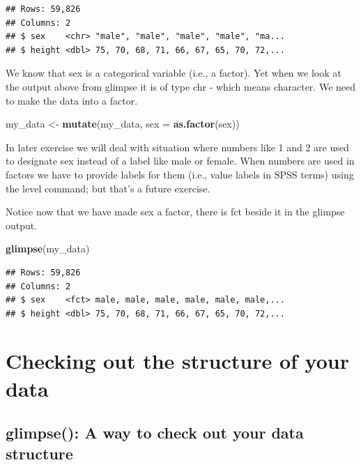 \documentclass[
]{krantz}
\makeatletter
\newenvironment{Shaded}{\begin{snugshade}}{\end{snugshade}}
\newcommand{\DataTypeTok}[1]{\textcolor[rgb]{0.27,0.27,0.27}{#1}}
\newcommand{\KeywordTok}[1]{\textcolor[rgb]{0.27,0.27,0.27}{\textbf{#1}}}
\newcommand{\NormalTok}[1]{#1}
\newcommand{\StringTok}[1]{\textcolor[rgb]{0.5,0.5,0.5}{#1}}
\newenvironment{kframe}{%
\medskip{}
\setlength{\fboxsep}{.8em}
 \def\at@end@of@kframe{}%
 \ifinner\ifhmode%
  \def\at@end@of@kframe{\end{minipage}}%
  \begin{minipage}{\columnwidth}%
 \fi\fi%
 \def\FrameCommand##1{\hskip\@totalleftmargin \hskip-\fboxsep
 \colorbox{shadecolor}{##1}\hskip-\fboxsep
     \hskip-\linewidth \hskip-\@totalleftmargin \hskip\columnwidth}%
 \MakeFramed {\advance\hsize-\width
   \@totalleftmargin\z@ \linewidth\hsize
   \@setminipage}}%
 {\par\unskip\endMakeFramed%
 \at@end@of@kframe}
\renewenvironment{Shaded}{\begin{kframe}}{\end{kframe}}
\makeatother
\begin{document}
\begin{verbatim}
## Rows: 59,826
## Columns: 2
## $ sex    <chr> "male", "male", "male", "male", "ma...
## $ height <dbl> 75, 70, 68, 71, 66, 67, 65, 70, 72,...
\end{verbatim}

We know that sex is a categorical variable (i.e., a factor). Yet when we look at the output above from glimpse it is of type chr - which means character. We need to make the data into a factor.

\begin{Shaded}
\begin{Highlighting}[]
\NormalTok{my_data <-}\StringTok{ }\KeywordTok{mutate}\NormalTok{(my_data, }\DataTypeTok{sex =} \KeywordTok{as.factor}\NormalTok{(sex))}
\end{Highlighting}
\end{Shaded}

In later exercise we will deal with situation where numbers like 1 and 2 are used to designate sex instead of a label like male or female. When numbers are used in factors we have to provide labels for them (i.e., value labels in SPSS terms) using the level command; but that's a future exercise.

Notice now that we have made sex a factor, there is fct beside it in the glimpse output.

\begin{Shaded}
\begin{Highlighting}[]
\KeywordTok{glimpse}\NormalTok{(my_data)}
\end{Highlighting}
\end{Shaded}

\begin{verbatim}
## Rows: 59,826
## Columns: 2
## $ sex    <fct> male, male, male, male, male, male,...
## $ height <dbl> 75, 70, 68, 71, 66, 67, 65, 70, 72,...
\end{verbatim}

\hypertarget{checking-out-the-structure-of-your-data}{%
\section{Checking out the structure of your data}\label{checking-out-the-structure-of-your-data}}

\hypertarget{glimpse-a-way-to-check-out-your-data-structure}{%
\subsection{glimpse(): A way to check out your data structure}\label{glimpse-a-way-to-check-out-your-data-structure}}
\end{document}

